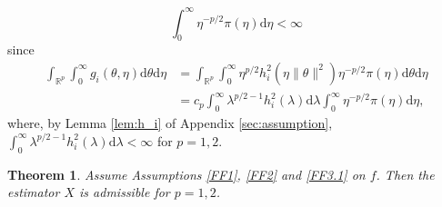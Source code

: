 \documentclass[preprint,11pt]{imsart}
\numberwithin{equation}{section}
\theoremstyle{plain}
\newtheorem{thm}{Theorem}[section]
\theoremstyle{definition}
\theoremstyle{remark}
\newcommand{\rd}{\mathrm{d}}
\begin{document}
\begin{equation}\label{eq:pieta}
 \int_0^\infty \eta^{-p/2}\pi(\eta)\rd \eta<\infty
\end{equation}
since
\begin{align*}
\int_{\mathbb{R}^p}\int_0^\infty g_i(\theta,\eta)\rd\theta\rd\eta 
&=\int_{\mathbb{R}^p}\int_0^\infty \eta^{p/2}h^2_i(\eta\|\theta\|^2)\eta^{-p/2}\pi(\eta)\rd\theta\rd\eta \\
&=c_p\int_0^\infty \lambda^{p/2-1} h^2_i(\lambda)\rd\lambda\int_0^\infty\eta^{-p/2}\pi(\eta)\rd\eta,
\end{align*}
where, by Lemma \ref{lem:h_i} of  Appendix \ref{sec:assumption},
$\int_0^\infty \lambda^{p/2-1} h^2_i(\lambda)\rd\lambda<\infty $ for $p=1,2$. 
\begin{thm}
Assume Assumptions \ref{FF1}, \ref{FF2} and \ref{FF3.1} on $f$.
Then the estimator $X$ is admissible for $p=1,2$. 
\end{thm}
\end{document}
